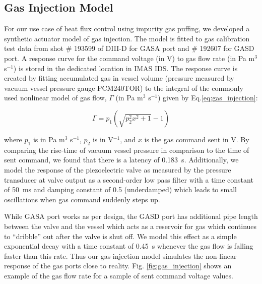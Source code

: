 \subsection{Gas Injection Model}{\label{subsec:gas_injection}}
For our use case of heat flux control using impurity gas puffing, we developed a synthetic actuator model of gas injection. The model is fitted to gas calibration test data from shot \# 193599 of DIII-D for GASA port and \# 192607 for GASD port. A response curve for the command voltage (in V) to gas flow rate (in Pa m$^3$ s$^{-1}$) is stored in the dedicated location in IMAS IDS. The response curve is created by fitting accumulated gas in vessel volume (pressure measured by vacuum vessel pressure gauge PCM240TOR) to the integral of the commonly used nonlinear model of gas flow, $\Gamma$ (in Pa m$^3$ s$^{-1}$) given by Eq.\ref{eq:gas_injection}:

\begin{equation}
 \label{eq:gas_injection}
 \Gamma = p_1 \left(\sqrt{p_2^2 x^2 + 1} - 1\right)
\end{equation}

where $p_1$ is in Pa m$^3$ s$^{-1}$, $p_2$ is in V$^{-1}$, and $x$ is the gas command sent in V. By comparing the rise-time of vacuum vessel pressure in comparison to the time of sent command, we found that there is a latency of 0.183~s. Additionally, we model the response of the piezoelectric valve as measured by the pressure transducer at valve output as a second-order low pass filter with a time constant of 50~ms and damping constant of 0.5 (underdamped) which leads to small oscillations when gas command suddenly steps up.

 While GASA port works as per design\cite{bates_1984_rsi}, the GASD port has additional pipe length between the valve and the vessel which acts as a reservoir for gas which continues to ``dribble'' out after the valve is shut off. We model this effect as a simple exponential decay with a time constant of 0.45~s whenever the gas flow is falling faster than this rate. Thus our gas injection model simulates the non-linear response of the gas ports close to reality. Fig. \ref{fig:gas_injection} shows an example of the gas flow rate for a sample of sent command voltage values.
